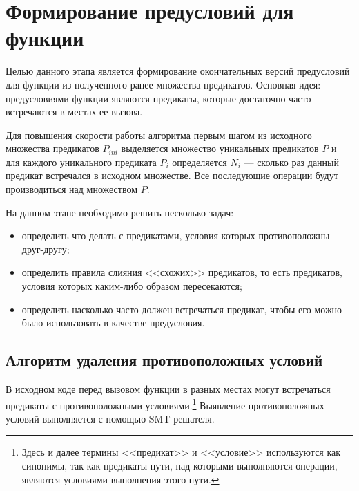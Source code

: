 \section{Формирование предусловий для функции}
\label{section:merging}
Целью данного этапа является формирование окончательных версий предусловий для функции из полученного ранее множества предикатов. Основная идея: предусловиями функции являются предикаты, которые достаточно часто встречаются в местах ее вызова. 

Для повышения скорости работы алгоритма первым шагом из исходного множества предикатов $P_{ini}$ выделяется множество уникальных предикатов $P$ и для каждого уникального предиката $P_i$ определяется $N_i$ --- сколько раз данный предикат встречался в исходном множестве. Все последующие операции будут производиться над множеством $P$.

На данном этапе необходимо решить несколько задач:
\begin{itemize}
\item определить что делать с предикатами, условия которых противоположны друг-другу;
\item определить правила слияния <<схожих>> предикатов, то есть предикатов, условия которых каким-либо образом пересекаются;
\item определить насколько часто должен встречаться предикат, чтобы его можно было использовать в качестве предусловия.
\end{itemize}

\subsection{Алгоритм удаления противоположных условий}
\label{section:deleting}
В исходном коде перед вызовом функции в разных местах могут встречаться предикаты с противоположными условиями.\footnote{Здесь и далее термины <<предикат>> и <<условие>> используются как синонимы, так как предикаты пути, над которыми выполняются операции, являются условиями выполнения этого пути.} Выявление противоположных условий выполняется с помощью SMT решателя. 

